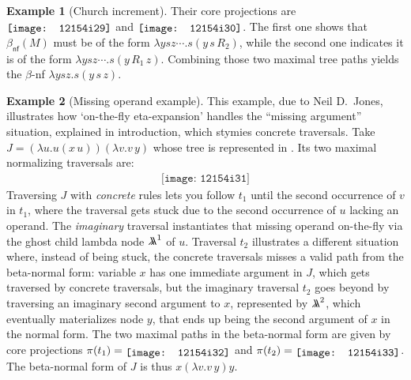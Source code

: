 \documentclass[xchauthor,chkrefs,GCNS,amsmath,amsthm,rotating,leaveRGB]{tcsg}
\theoremstyle{plain}
\theoremstyle{definition}
\newtheorem{example}{Example}[section]
\def\coresymbol{\pi}
\newcommand{\core}[1]{\coresymbol(#1)}
\newcommand{\ghostlmd}{{\lambda\mkern-7mu \lambda}}
\begin{document}
\begin{example}[Church increment]
Their core projections are $\raisebox{-1pt}{\texttt{[image: 12154i29]}}$ and
$\raisebox{-1pt}{\texttt{[image: 12154i30]}}$. The first one shows that $\beta
_{\mathsf{nf}}(M)$ must be of the form $\lambda y s z \cdots . s (y\, s\,
R_{2})$, while the second one indicates it is of the form  $\lambda y s z
\cdots . s(y\, R_{1}\, z)$. Combining those two maximal tree paths yields the
$\beta $-nf $\lambda y s z . s(y\, s\, z)$.
\end{example}

\begin{example}[Missing operand example]\label{ex:missingoperand}
This example, due to Neil D.~Jones, illustrates how `on-the-fly
eta-expansion' handles the ``missing argument'' situation, explained in
introduction, which stymies concrete traversals. Take $J = (\lambda u . u
(x\,u)) (\lambda v . v\, y)$ whose tree is represented in
. Its two maximal normalizing
traversals are:
%
\begin{eqnarray*}
\texttt{[image: 12154i31]}
\end{eqnarray*}
%
Traversing $J$ with \emph{concrete} rules lets you follow $t_{1}$ until the
second occurrence of $v$ in $t_{1}$, where the traversal gets stuck due to
the second occurrence of $u$ lacking an operand. The \emph{imaginary}
traversal instantiates that missing operand on-the-fly via the ghost child
lambda node $\ghostlmd ^{1}$ of $u$. Traversal $t_{2}$ illustrates a
different situation where, instead of being stuck, the concrete traversals
misses a valid path from the beta-normal form: variable $x$ has one immediate
argument in $J$, which gets traversed by concrete traversals, but the
imaginary traversal $t_{2}$ goes beyond by traversing an imaginary second
argument to $x$, represented by $\ghostlmd ^{2}$, which eventually
materializes node $y$, that ends up being the second argument of $x$ in the
normal form. The two maximal paths in the beta-normal form are given by core
projections $\core{t_{1}} = \raisebox{-2pt}{\texttt{[image: 12154i32]}}$ and
 $\core{t_{2}} = \raisebox{-2pt}{\texttt{[image: 12154i33]}}$.
The beta-normal form of $J$ is thus $x (\lambda v.v\,y) y$.
\end{example}
\end{document}
